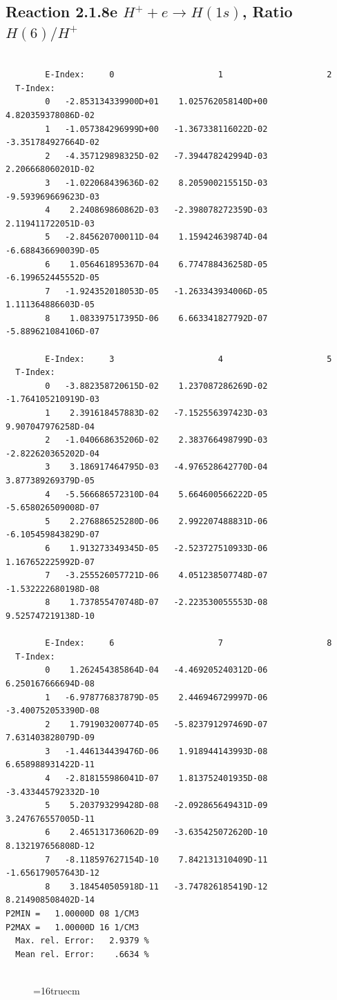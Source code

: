 \documentclass[12pt,dvipdfmx]{article}
\begin{document}
\subsection{
Reaction 2.1.8e  $H^+ + e \rightarrow H(1s) $,  Ratio $H(6)/H^+$
}

\begin{small}\begin{verbatim}

        E-Index:     0                     1                     2
  T-Index:
        0   -2.853134339900D+01    1.025762058140D+00    4.820359378086D-02
        1   -1.057384296999D+00   -1.367338116022D-02   -3.351784927664D-02
        2   -4.357129898325D-02   -7.394478242994D-03    2.206668060201D-02
        3   -1.022068439636D-02    8.205900215515D-03   -9.593969669623D-03
        4    2.240869860862D-03   -2.398078272359D-03    2.119411722051D-03
        5   -2.845620700011D-04    1.159424639874D-04   -6.688436690039D-05
        6    1.056461895367D-04    6.774788436258D-05   -6.199652445552D-05
        7   -1.924352018053D-05   -1.263343934006D-05    1.111364886603D-05
        8    1.083397517395D-06    6.663341827792D-07   -5.889621084106D-07

        E-Index:     3                     4                     5
  T-Index:
        0   -3.882358720615D-02    1.237087286269D-02   -1.764105210919D-03
        1    2.391618457883D-02   -7.152556397423D-03    9.907047976258D-04
        2   -1.040668635206D-02    2.383766498799D-03   -2.822620365202D-04
        3    3.186917464795D-03   -4.976528642770D-04    3.877389269379D-05
        4   -5.566686572310D-04    5.664600566222D-05   -5.658026509008D-07
        5    2.276886525280D-06    2.992207488831D-06   -6.105459843829D-07
        6    1.913273349345D-05   -2.523727510933D-06    1.167652225992D-07
        7   -3.255526057721D-06    4.051238507748D-07   -1.532222680198D-08
        8    1.737855470748D-07   -2.223530055553D-08    9.525747219138D-10

        E-Index:     6                     7                     8
  T-Index:
        0    1.262454385864D-04   -4.469205240312D-06    6.250167666694D-08
        1   -6.978776837879D-05    2.446946729997D-06   -3.400752053390D-08
        2    1.791903200774D-05   -5.823791297469D-07    7.631403828079D-09
        3   -1.446134439476D-06    1.918944143993D-08    6.658988931422D-11
        4   -2.818155986041D-07    1.813752401935D-08   -3.433445792332D-10
        5    5.203793299428D-08   -2.092865649431D-09    3.247676557005D-11
        6    2.465131736062D-09   -3.635425072620D-10    8.132197656808D-12
        7   -8.118597627154D-10    7.842131310409D-11   -1.656179057643D-12
        8    3.184540505918D-11   -3.747826185419D-12    8.214908508402D-14
P2MIN =   1.00000D 08 1/CM3
P2MAX =   1.00000D 16 1/CM3
  Max. rel. Error:   2.9379 %
  Mean rel. Error:    .6634 %


\end{verbatim}\end{small}
\begin{figure} \label{2.1.8re}
\epsfxsize=16truecm
\end{figure}
\newpage
\end{document}
